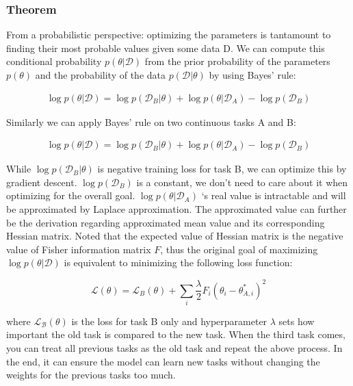 \subsubsection{Theorem}
From a probabilistic perspective: optimizing the parameters is tantamount to finding their most probable values given some data D. We can compute this conditional probability $p(\theta | \mathcal{D})$ from the prior probability of the parameters $p(\theta)$ and the probability of the data $p(\mathcal{D}|\theta)$ by using Bayes’ rule:

\begin{equation}
\begin{aligned}
\log p(\theta | \mathcal{D})=\log p\left(\mathcal{D}_{B} | \theta\right)+\log p\left(\theta | \mathcal{D}_{A}\right)-\log p\left(\mathcal{D}_{B}\right)
\end{aligned}
\end{equation}

Similarly we can apply Bayes' rule on two continuous tasks A and B: 

\begin{equation}
\begin{aligned}
\log p(\theta | \mathcal{D})=\log p\left(\mathcal{D}_{B} | \theta\right)+\log p\left(\theta | \mathcal{D}_{A}\right)-\log p\left(\mathcal{D}_{B}\right)
\end{aligned}
\end{equation}

While $\log p(\mathcal{D}_{B}|\theta)$ is negative training loss for task B, we can optimize this by gradient descent.
$\log p(\mathcal{D}_{B})$ is a constant, we don't need to care about it when optimizing for the overall goal. $\log p(\theta|\mathcal{D}_{A})$ ‘s real value is intractable and will be approximated by Laplace approximation. The approximated value can further be the derivation regarding approximated mean value and its corresponding Hessian matrix. Noted that the expected value of Hessian matrix is the negative value of Fisher information matrix $F$, thus the original goal of maximizing $\log p(\theta | \mathcal{D})$ is equivalent to minimizing the following loss function:

\begin{equation}
\mathcal{L}(\theta)=\mathcal{L}_{B}(\theta)+\sum_{i} \frac{\lambda}{2} F_{i}\left(\theta_{i}-\theta_{A, i}^{*}\right)^{2}
\end{equation}

where $\mathcal{L}_{\mathcal{B}}(\theta)$ is the loss for task B only and hyperparameter $\lambda$ sets how important the old task is compared to the new task. When the third task comes, you can treat all previous tasks as the old task and repeat the above process. In the end, it can ensure the model can learn new tasks without changing the weights for the previous tasks too much. 

